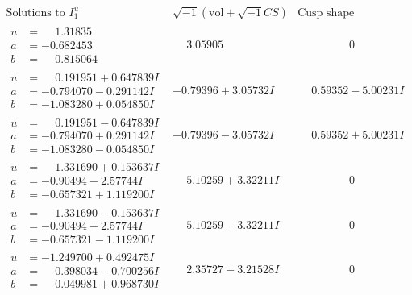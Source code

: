 \documentclass[1p]{elsarticle_modified}
\theoremstyle{definition}
\newcommand{\I}{\sqrt{-1}}
\begin{document}
$$\begin{array}{c|c|c}
\text{Solutions to }I^u_{1}& \I (\text{vol} + \sqrt{-1}CS) & \text{Cusp shape}\\
 \hline 
\begin{aligned}
u &= \phantom{-}1.31835\phantom{ +0.000000I} \\
a &= -0.682453\phantom{ +0.000000I} \\
b &= \phantom{-}0.815064\phantom{ +0.000000I}\end{aligned}
 & \phantom{-}3.05905\phantom{ +0.000000I} & \phantom{-0.000000 } 0 \\ \hline\begin{aligned}
u &= \phantom{-}0.191951 + 0.647839 I \\
a &= -0.794070 - 0.291142 I \\
b &= -1.083280 + 0.054850 I\end{aligned}
 & -0.79396 + 3.05732 I & \phantom{-}0.59352 - 5.00231 I \\ \hline\begin{aligned}
u &= \phantom{-}0.191951 - 0.647839 I \\
a &= -0.794070 + 0.291142 I \\
b &= -1.083280 - 0.054850 I\end{aligned}
 & -0.79396 - 3.05732 I & \phantom{-}0.59352 + 5.00231 I \\ \hline\begin{aligned}
u &= \phantom{-}1.331690 + 0.153637 I \\
a &= -0.90494 - 2.57744 I \\
b &= -0.657321 + 1.119200 I\end{aligned}
 & \phantom{-}5.10259 + 3.32211 I & \phantom{-0.000000 } 0 \\ \hline\begin{aligned}
u &= \phantom{-}1.331690 - 0.153637 I \\
a &= -0.90494 + 2.57744 I \\
b &= -0.657321 - 1.119200 I\end{aligned}
 & \phantom{-}5.10259 - 3.32211 I & \phantom{-0.000000 } 0 \\ \hline\begin{aligned}
u &= -1.249700 + 0.492475 I \\
a &= \phantom{-}0.398034 - 0.700256 I \\
b &= \phantom{-}0.049981 + 0.968730 I\end{aligned}
 & \phantom{-}2.35727 - 3.21528 I & \phantom{-0.000000 } 0 \\ \hline\begin{aligned}

\end{aligned}
\end{array}$$
\end{document}
